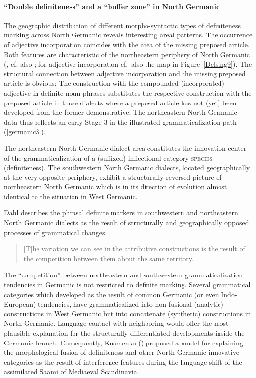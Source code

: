 {
\paragraph{“Double definiteness” and a “buffer zone” in North Germanic}\label{buffer}
The geographic distribution of different morpho-syntactic types of definiteness marking across North Germanic reveals interesting areal patterns. The occurrence of adjective incorporation coincides with the area of the missing preposed article. Both features are characteristic of the northeastern periphery of North Germanic (\citealt{delsing1996b}, cf. also \citealt{riesler2001a,riesler2002a}; for adjective incorporation cf.~also the map in Figure~\ref{Delsing9}). The structural connection between adjective incorporation and the missing preposed article is obvious: The construction with the compounded (incorporated) adjective in definite noun phrases substitutes the respective construction with the preposed article in those dialects where a preposed article has not (yet) been developed from the former demonstrative. The northeastern North Germanic data thus reflects an early Stage 3 in the illustrated grammaticalization path (\ref{germanic3}).

The northeastern North Germanic dialect area constitutes the innovation center of the grammaticalization of a (suffixed) inflectional category \textsc{species} (definiteness). The southwestern North Germanic dialects, located geographically at the very opposite periphery, exhibit a structurally reversed picture of northeastern North Germanic which is in its direction of evolution almost identical to the situation in West Germanic.

Dahl describes the phrasal definite markers in southwestern and northeastern North Germanic dialects as the result of structurally and geographically opposed processes of grammatical changes.
\begin{quote}
[T]he variation we can see in the attributive constructions is the result of the competition between them about the same territory. \citep[147]{dahl2003}
\end{quote}
The “competition” between northeastern and southwestern grammaticalization tendencies in Germanic is not restricted to definite marking. Several grammatical categories which developed as the result of common Germanic (or even Indo-European) tendencies, have grammaticalized into non-fusional (analytic) constructions in West Germanic but into concatenate (synthetic) constructions in North Germanic. Language contact with neighboring  would offer the most plausible explanation for the structurally differentiated developments inside the Germanic branch. Consequently, Kusmenko (\citeyear{kusmenko2008}) proposed a model for explaining the morphological fusion of definiteness and other North Germanic innovative categories as the result of interference features during the language shift of the assimilated Saami of Mediaeval Scandinavia.

}
